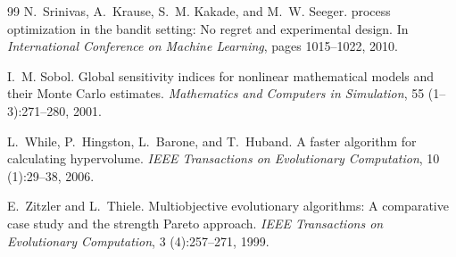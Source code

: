 \documentclass[11pt,a4paper]{ctexart}
\begin{document}
\begin{thebibliography}{99}
N.~Srinivas, A.~Krause, S.~M. Kakade, and M.~W. Seeger.
 process optimization in the bandit setting: No regret and experimental design.
\newblock In \emph{International Conference on Machine Learning}, pages 1015--1022, 2010.

I.~M. Sobol.
\newblock Global sensitivity indices for nonlinear mathematical models and their {Monte Carlo} estimates.
\newblock \emph{Mathematics and Computers in Simulation}, 55 (1--3):271--280, 2001.

L.~While, P.~Hingston, L.~Barone, and T.~Huband.
\newblock A faster algorithm for calculating hypervolume.
\newblock \emph{IEEE Transactions on Evolutionary Computation}, 10 (1):29--38, 2006.

E.~Zitzler and L.~Thiele.
\newblock Multiobjective evolutionary algorithms: A comparative case study and the strength {Pareto} approach.
\newblock \emph{IEEE Transactions on Evolutionary Computation}, 3 (4):257--271, 1999.

\end{thebibliography}
\end{document}
